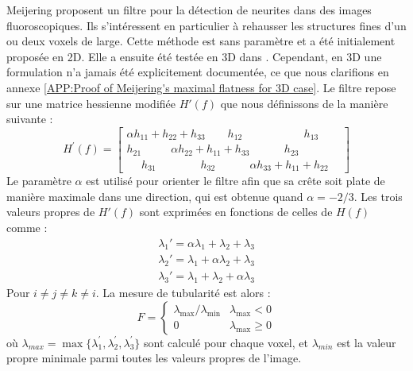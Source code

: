 Meijering \etal \cite{Meijering2004_neurite_vesselness} proposent un filtre pour la détection de neurites dans des images fluoroscopiques. Ils s'intéressent en particulier à rehausser les structures fines d'un ou deux voxels de large. Cette méthode est sans paramètre et a été initialement proposée en 2D. Elle a ensuite été testée en 3D dans \cite{Obara2012_phase}. Cependant, en 3D une formulation n'a jamais été explicitement documentée, ce que nous clarifions en annexe \ref{APP:Proof of Meijering's maximal flatness for 3D case}. Le filtre repose sur une matrice hessienne modifiée $H'(f)$ que nous définissons de la manière suivante :
\begin{equation}
    H^{'}(f)=
    \begin{bmatrix}
    \alpha h_{11}+ h_{22} +   h_{33} ~~~~~~~~~ h_{12} ~~~~~~~~~~~~~~~~~~~~~~~~~ h_{13} ~~~~~~~~ \\
    h_{21} ~~~~~~~~~~~~ \alpha h_{22} + h_{11} +  h_{33} ~~~~~~~~~~~~~~ h_{23} \\
    ~~~~~~ h_{31} ~~~~~~~~~~~~~~~~~~ h_{32} ~~~~~~~~~~~~~~ \alpha h_{33} + h_{11} +  h_{22}
    \end{bmatrix}
\end{equation}
Le paramètre $\alpha$ est utilisé pour orienter le filtre afin que sa crête soit plate de manière maximale dans une direction, qui est obtenue quand $\alpha=-2/3$. Les trois valeurs propres de $H'(f)$ sont exprimées en fonctions de celles de $H(f)$ comme :
\begin{equation}
  \begin{aligned}
    \nonumber \lambda_1' = \alpha\lambda_1 + \lambda_2 + \lambda_3 \\
    \nonumber \lambda_2' = \lambda_1 + \alpha\lambda_2 + \lambda_3 \\
    \nonumber \lambda_3' = \lambda_1 + \lambda_2 + \alpha\lambda_3
  \end{aligned}
\end{equation}
Pour $i \neq j \neq k \neq i$.
La mesure de tubularité est alors :
\begin{equation}
\nonumber 
  F =
  \left\{
  \begin{array}{lr}
    \lambda_{\max} / \lambda_{\min}   &  \lambda_{\max} < 0\\
      0 &  \lambda_{\max} \geqslant 0
  \end{array}
  \right.
\end{equation}
où $\lambda_{max} = \max\{\lambda_{1}^{'},\lambda_{2}^{'},\lambda_{3}^{'}\}$ sont calculé pour chaque voxel, et $\lambda_{min}$ est la valeur propre minimale parmi toutes les valeurs propres de l'image.

